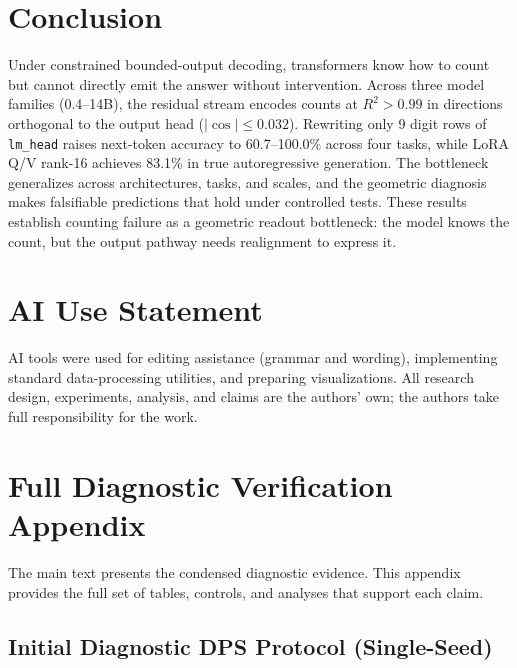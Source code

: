 \documentclass{article}
\begin{document}
\section{Conclusion}

Under constrained bounded-output decoding, transformers know how to count but
cannot directly emit the answer without intervention. Across three model
families (0.4--14B), the residual stream encodes counts at $R^2>0.99$ in
directions orthogonal to the output head ($|\cos| \leq 0.032$). Rewriting only
9 digit rows of \texttt{lm\_head} raises next-token accuracy to 60.7--100.0\%
across four tasks, while LoRA Q/V rank-16 achieves 83.1\% in true
autoregressive generation. The bottleneck generalizes across architectures,
tasks, and scales, and the geometric diagnosis makes falsifiable predictions
that hold under controlled tests. These results establish counting failure as a
geometric readout bottleneck: the model knows the count, but the output pathway
needs realignment to express it.

\section*{AI Use Statement}
AI tools were used for editing assistance (grammar and wording), implementing standard data-processing utilities, and preparing visualizations. All research design, experiments, analysis, and claims are the authors' own; the authors take full responsibility for the work.




\appendix

\section{Full Diagnostic Verification Appendix}
\label{sec:appendix_dps}

The main text presents the condensed diagnostic evidence. This appendix provides
the full set of tables, controls, and analyses that support each claim.

\subsection{Initial Diagnostic DPS Protocol (Single-Seed)}
\label{sec:dps_initial}
\end{document}

